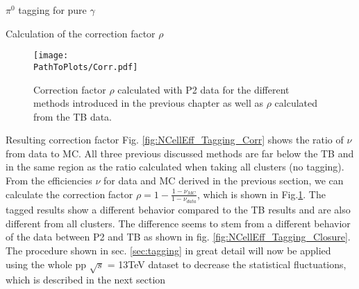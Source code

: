 \documentclass[ALICE]{ALICE_analysis_notes}
\newcommand{\PZ}{$\pi^0$\xspace}
\newcommand{\g}{$\gamma$\xspace}
\newcommand{\PathToPlots}{/home/joshua/PCG_Software/EMCal_NCellEffi/13TeVNomB_Wide/Pi0Tagging_13TeV_nom_04_26_WithTRD_WithBorderCells_1cellFT/pdf}
\begin{document}
\begin{section}{\PZ tagging for pure \g}
\begin{section}{Calculation of the correction factor $\rho$}
	
	\begin{figure}[t]
		\centering
		\texttt{[image: \\PathToPlots/Corr.pdf]}
		\caption{Correction factor $\rho$ calculated with P2 data for the different methods introduced in the previous chapter as well as $\rho$ calculated from the TB data. }
		\label{fig:NCells_Rho}
	\end{figure}
	


\end{section}

\begin{subsection}{Resulting correction factor}
	Fig. \ref{fig:NCellEff_Tagging_Corr} shows the ratio of $\nu$ from data to MC. All three previous discussed methods are far below the TB and in the same region as the ratio calculated when taking all clusters (no tagging).\\
	From the efficiencies $\nu$ for data and MC derived in the previous section, we can calculate the correction factor $\rho = 1 - \frac{1- \nu_{MC}}{1- \nu_{data}}$, which is shown in Fig.\ref{fig:NCells_Rho}. The tagged results show a different behavior compared to the TB results and are also different from all clusters. The difference seems to stem from a different behavior of the data between P2 and TB as shown in fig. \ref{fig:NCellEff_Tagging_Closure}.
    The procedure shown in sec. \ref{sec:tagging} in great detail will now be applied using the whole pp $\sqrt{s}$ = 13TeV dataset to decrease the statistical fluctuations, which is described in the next section
	
\end{subsection}


\end{section}


\newpage
\end{document}
